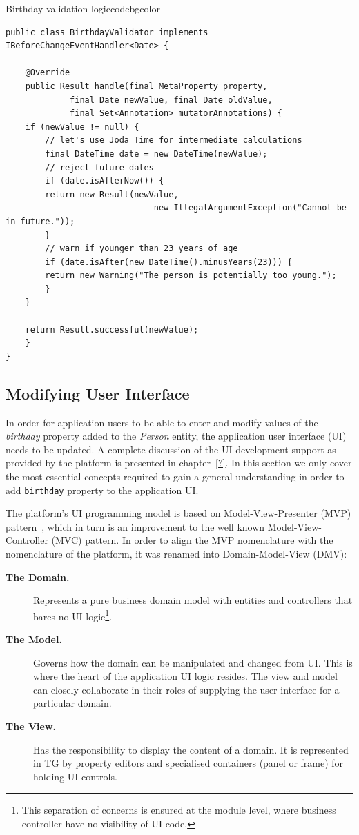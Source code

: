  \begin{code}{Birthday validation logic}{\label{lst:Person-birthday-validation}}{codebgcolor}
    \begin{lstlisting}
public class BirthdayValidator implements IBeforeChangeEventHandler<Date> {

    @Override
    public Result handle(final MetaProperty property, 
			 final Date newValue, final Date oldValue, 
			 final Set<Annotation> mutatorAnnotations) {
	if (newValue != null) {
	    // let's use Joda Time for intermediate calculations
	    final DateTime date = new DateTime(newValue);
	    // reject future dates 
	    if (date.isAfterNow()) {
		return new Result(newValue, 
	                          new IllegalArgumentException("Cannot be in future."));
	    }
	    // warn if younger than 23 years of age 
	    if (date.isAfter(new DateTime().minusYears(23))) {
		return new Warning("The person is potentially too young.");
	    }
	}	
	
	return Result.successful(newValue);
    }
}
    \end{lstlisting}
  \end{code}

\subsection{Modifying User Interface}
  In order for application users to be able to enter and modify values of the \emph{birthday} property added to the \emph{Person} entity, the application user interface (UI) needs to be updated.
  A complete discussion of the UI development support as provided by the platform is presented in chapter~\ref{?}.
  In this section we only cover the most essential concepts required to gain a general understanding in order to add \texttt{birthday} property to the application UI.

  The platform's UI programming model is based on Model-View-Presenter (MVP) pattern~\cite{BoGl2000}, which in turn is an improvement to the well known Model-View-Controller (MVC) pattern.  
  In order to align the MVP nomenclature with the nomenclature of the platform, it was renamed into Domain-Model-View (DMV):
  \begin{description}
    \item[\textbf{The Domain.}] Represents a pure business domain model with entities and controllers that bares no UI logic\footnote{This separation of concerns is ensured at the module level, where business controller have no visibility of UI code.}.
    \item [\textbf{The Model.}] Governs how the domain can be manipulated and changed from UI. 
	This is where the heart of the application UI logic resides. The view and model can closely collaborate in their roles of supplying the user interface for a particular domain.
    \item[\textbf{The View.}] Has the responsibility to display the content of a domain. 
	It is represented in TG by property editors and specialised containers (panel or frame) for holding UI controls.    
  \end{description}

